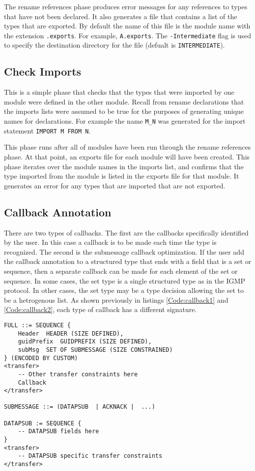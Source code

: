 \documentclass[12pt,oneside,letterpaper]{article}
\begin{document}
The rename references phase produces error messages for any references to types that have not been declared.  It also generates a file that contains a list of the types that are exported.  By default the name of this file is the module name with the extension \texttt{.exports}. For example, \texttt{A.exports}. The \texttt{-Intermediate} flag is used to specify the destination directory for the file (defualt is \texttt{INTERMEDIATE}).

\subsection{Check Imports}
\label{sec:CheckImports}
This is a simple phase that checks that the types that were imported by one module were defined in the other module. Recall from rename declarations that the imports lists were assumed to be true for the purposes of generating unique names for declarations. For example the name \texttt{M\_N} was generated for the import statement \texttt{IMPORT M FROM N}.

This phase runs after all of modules have been run through the rename references phase. At that point, an exports file for each module will have been created. This phase iterates over the module names in the imports list, and confirms that the type imported from the module is listed in the exports file for that module. It generates an error for any types that are imported that are not exported. 

\subsection{Callback Annotation}
\label{sec:CallbackAnnotation}
There are two types of callbacks. The first are the callbacks specifically identified by the user. In this case a callback is to be made each time the type is recognized. The second is the submessage callback optimization. If the user add the callback annotation to a structured type that ends with a field that is a set or sequence, then a separate callback can be made for each element of the set or sequence. In some cases, the set type is a single structured type as in the IGMP protocol. In other cases, the set type may be a type decision allowing the set to be a hetrogenous list. As shown previously in listings \ref{Code:callback1} and \ref{Code:callback2}, each type of callback has a different signature. 

\begin{lstlisting}[language=SCL2,style=mystyle,frame=none,float,
caption=Before Callback Annotation,label=Code:beforeCallback, xleftmargin=3.5ex]
FULL ::= SEQUENCE {
    Header  HEADER (SIZE DEFINED),
    guidPrefix  GUIDPREFIX (SIZE DEFINED),
    subMsg  SET OF SUBMESSAGE (SIZE CONSTRAINED)
} (ENCODED BY CUSTOM)
<transfer>
    -- Other transfer constraints here
    Callback
</transfer>

SUBMESSAGE ::= (DATAPSUB  | ACKNACK |  ...)
    
DATAPSUB := SEQUENCE {
    -- DATAPSUB fields here
}
<transfer>
    -- DATAPSUB specific transfer constraints
</transfer>
\end{lstlisting}
\end{document}
